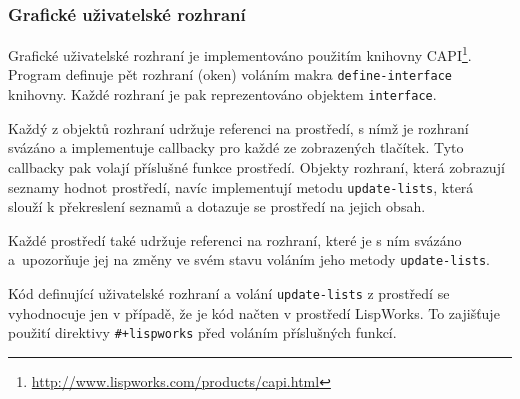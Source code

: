 \subsubsection{Grafické uživatelské rozhraní}
Grafické uživatelské rozhraní je implementováno použitím knihovny
CAPI\footnote{\url{http://www.lispworks.com/products/capi.html}}. Program
definuje pět rozhraní (oken) voláním makra \verb|define-interface| knihovny.
Každé rozhraní je pak reprezentováno objektem \verb|interface|.

Každý z objektů rozhraní udržuje referenci na prostředí, s nímž je rozhraní
svázáno a implementuje callbacky pro každé ze zobrazených tlačítek. Tyto
callbacky pak volají příslušné funkce prostředí. Objekty rozhraní, která
zobrazují seznamy hodnot prostředí, navíc implementují metodu
\verb|update-lists|, která slouží k překreslení seznamů a dotazuje se prostředí
na jejich obsah.

Každé prostředí také udržuje referenci na rozhraní, které je s ním svázáno
a~upozorňuje jej na změny ve svém stavu voláním jeho metody \verb|update-lists|.

Kód definující uživatelské rozhraní a volání \verb|update-lists| z prostředí se
vyhodnocuje jen v případě, že je kód načten v prostředí LispWorks. To zajišťuje
použití direktivy \verb|#+lispworks| před voláním příslušných funkcí.
